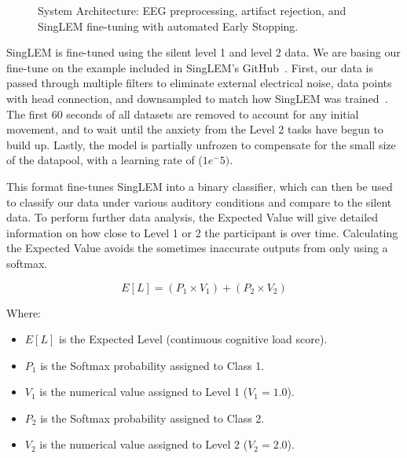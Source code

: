 \documentclass[journal]{IEEEtran}
\begin{document}
\begin{figure}[htbp]
{%
    }
    \caption{System Architecture: EEG preprocessing, artifact rejection, and SingLEM fine-tuning with automated Early Stopping.}
    \label{fig:methodology_flow}
\end{figure}

SingLEM is fine-tuned using the silent level 1 and level 2 data. We are basing our fine-tune on the example included in SingLEM's GitHub~\cite{SingLEM}. First, our data is passed through multiple filters to eliminate external electrical noise, data points with head connection, and downsampled to match how SingLEM was trained~\cite{jtof-dev-EE-499-2026}. The first 60 seconds of all datasets are removed to account for any initial movement, and to wait until the anxiety from the Level 2 tasks have begun to build up. Lastly, the model is partially unfrozen to compensate for the small size of the datapool, with a learning rate of (\(1e^-5)\).

This format fine-tunes SingLEM into a binary classifier, which can then be used to classify our data under various auditory conditions and compare to the silent data. To perform further data analysis, the Expected Value will give detailed information on how close to Level 1 or 2 the participant is over time. Calculating the Expected Value avoids the sometimes inaccurate outputs from only using a softmax.

\begin{equation}
    \label{eq:expected_level}
    E[L] = (P_1 \times V_1) + (P_2 \times V_2)
\end{equation}

Where:
\begin{itemize}
    \item $E[L]$ is the Expected Level (continuous cognitive load score).
    \item $P_1$ is the Softmax probability assigned to Class 1.
    \item $V_1$ is the numerical value assigned to Level 1 ($V_1 = 1.0$).
    \item $P_2$ is the Softmax probability assigned to Class 2.
    \item $V_2$ is the numerical value assigned to Level 2 ($V_2 = 2.0$).
\end{itemize}
\end{document}
